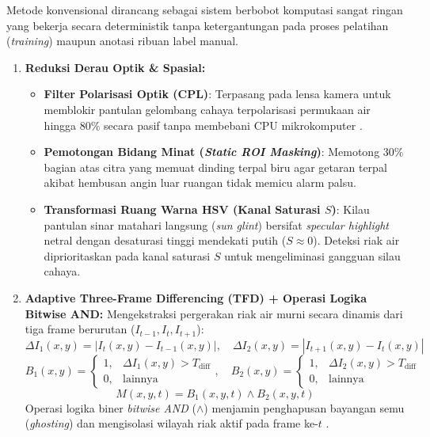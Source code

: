 \documentclass[10pt,a4paper]{article}
\providecommand{\text}[1]{\mbox{#1}}
\begin{document}
Metode konvensional dirancang sebagai sistem berbobot komputasi sangat ringan yang bekerja secara deterministik tanpa ketergantungan pada proses pelatihan (\textit{training}) maupun anotasi ribuan label manual.

\begin{enumerate}
    \item \textbf{Reduksi Derau Optik \& Spasial:}
    \begin{itemize}
        \item \textbf{Filter Polarisasi Optik (CPL)}: Terpasang pada lensa kamera untuk memblokir pantulan gelombang cahaya terpolarisasi permukaan air hingga $80\%$ secara pasif tanpa membebani CPU mikrokomputer \cite{Li2020}.
        \item \textbf{Pemotongan Bidang Minat (\textit{Static ROI Masking})}: Memotong $30\%$ bagian atas citra yang memuat dinding terpal biru agar getaran terpal akibat hembusan angin luar ruangan tidak memicu alarm palsu.
        \item \textbf{Transformasi Ruang Warna HSV (Kanal Saturasi $S$)}: Kilau pantulan sinar matahari langsung (\textit{sun glint}) bersifat \textit{specular highlight} netral dengan desaturasi tinggi mendekati putih ($S \approx 0$). Deteksi riak air diprioritaskan pada kanal saturasi $S$ untuk mengeliminasi gangguan silau cahaya.
    \end{itemize}

    \item \textbf{Adaptive Three-Frame Differencing (TFD) + Operasi Logika Bitwise AND:}
    Mengekstraksi pergerakan riak air murni secara dinamis dari tiga frame berurutan ($I_{t-1}, I_t, I_{t+1}$):
    \begin{equation}
        \Delta I_1(x,y) = |I_t(x,y) - I_{t-1}(x,y)|, \quad \Delta I_2(x,y) = |I_{t+1}(x,y) - I_t(x,y)|
    \end{equation}
    \begin{equation}
        B_1(x,y) = \left\{ \begin{array}{ll} 1, & \Delta I_1(x,y) > T_{\text{diff}} \\ 0, & \text{lainnya} \end{array} \right., \quad 
        B_2(x,y) = \left\{ \begin{array}{ll} 1, & \Delta I_2(x,y) > T_{\text{diff}} \\ 0, & \text{lainnya} \end{array} \right.
    \end{equation}
    \begin{equation}
        M(x,y,t) = B_1(x,y,t) \land B_2(x,y,t)
    \end{equation}
    Operasi logika biner \textit{bitwise AND} ($\land$) menjamin penghapusan bayangan semu (\textit{ghosting}) dan mengisolasi wilayah riak aktif pada frame ke-$t$ \cite{Atoum2015}.


\end{enumerate}
\end{document}

